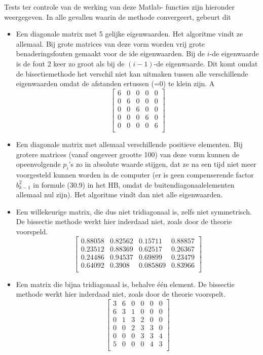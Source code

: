 \documentclass[]{article}
\begin{document}
Tests ter controle van de werking van deze Matlab- functies zijn hieronder weergegeven. In alle gevallen waarin de methode convergeert, gebeurt dit 
\begin{itemize}
	\item Een diagonale matrix met 5 gelijke eigenwaarden. Het algoritme vindt ze allemaal. Bij grote matrices van deze vorm worden vrij grote benaderingsfouten gemaakt voor de ide eigenwaarden. Bij de $i$-de eigenwaarde is de fout 2 keer zo groot als bij de $(i-1)$-de eigenwaarde. Dit komt omdat de bisectiemethode het verschil niet kan uitmaken tussen alle verschillende eigenwaarden omdat de afstanden ertussen (=0) te klein zijn.
	A\[\left[ \begin{array}{cccccc}
6 & 0 & 0 & 0 & 0 \\  
0 & 6 & 0 & 0 & 0 \\  
0 & 0 & 6 & 0 & 0 \\ 
0 & 0 & 0 & 6 & 0 \\ 
0 & 0 & 0 & 0 & 6 \\  
\end{array} \right] \]\linebreak

	\item Een diagonale matrix met allemaal verschillende positieve elementen. Bij  grotere matrices (vanaf ongeveer grootte 100) van deze vorm kunnen de opeenvolgende $p_i$'s zo in absolute waarde stijgen, dat ze na een tijd niet meer voorgesteld kunnen worden in de computer (er is geen compenserende factor $b_{k-1}^2$ in formule (30.9) in het HB, omdat de buitendiagonaalelementen allemaal nul zijn). Het algoritme vindt dan niet alle eigenwaarden.

	\item Een willekeurige matrix, die dus niet tridiagonaal is, zelfs niet symmetrisch. De bissectie methode werkt hier inderdaad niet, zoals door de theorie voorspeld.
\[	\left[	\begin{array}{ccccc}
0.88058&0.82562&0.15711&0.88857\\
0.23512&0.88369&0.62517&0.26367\\
0.24486&0.94537&0.69899&0.23479\\
0.64092&0.3908&0.085869&0.83966\\
\end{array}	\right]	\]\linebreak

	\item Een matrix die bijna tridiagonaal is, behalve \'{e}\'{e}n element. De bissectie methode werkt hier inderdaad niet, zoals door de theorie voorspelt.
	\[ \left[	\begin{array}{llllll}
3&6&0&0&0&0\\
6&3&1&0&0&0\\
0&1&3&2&0&0\\
0&0&2&3&3&0\\
0&0&0&3&3&4\\
5&0&0&0&4&3\\
\end{array}	\right] \]


\end{itemize}
\end{document}
